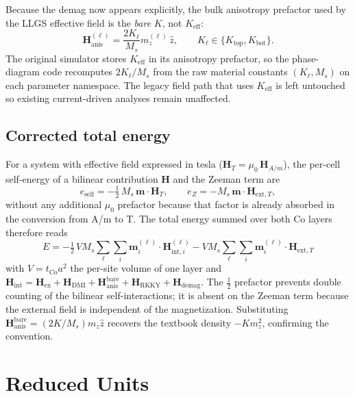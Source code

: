 \documentclass[11pt,a4paper]{article}
\newcommand{\mb}[1]{\mathbf{#1}}
\newcommand{\zhat}{\hat{z}}
\newcommand{\Hex}{\mb{H}_{\text{ex}}}
\newcommand{\Hdmi}{\mb{H}_{\text{DMI}}}
\newcommand{\Hanis}{\mb{H}_{\text{anis}}}
\newcommand{\Hdemag}{\mb{H}_{\text{demag}}}
\newcommand{\Hrkky}{\mb{H}_{\text{RKKY}}}
\newcommand{\tCo}{t_{\text{Co}}}
\newcommand{\Keff}{K_{\text{eff}}}
\newcommand{\Ms}{M_s}
\begin{document}
Because the demag now appears explicitly, the bulk
anisotropy prefactor used by the LLGS effective field is
the \emph{bare} $K$, not $\Keff$:
%
\begin{equation}
\Hanis^{(\ell)} = \frac{2 K_\ell}{\Ms} m_z^{(\ell)} \, \zhat,
\qquad K_\ell \in \{K_{\text{top}}, K_{\text{bot}}\}.
\end{equation}
%
The original simulator stores $\Keff$ in its anisotropy
prefactor, so the phase-diagram code recomputes
$2 K_\ell / \Ms$ from the raw material constants $(K_\ell,
\Ms)$ on each parameter namespace. The legacy field path
that uses $\Keff$ is left untouched so existing
current-driven analyses remain unaffected.

\subsection{Corrected total energy}

For a system with effective field expressed in tesla
($\mb{H}_T = \mu_0 \, \mb{H}_{A/m}$), the per-cell
self-energy
of a bilinear contribution $\mb{H}$ and the Zeeman term are
%
\begin{equation}\label{eq:E_density}
e_{\text{self}} = -\tfrac{1}{2}\, \Ms \,
    \mb{m} \cdot \mb{H}_T,
\qquad
e_Z = -\Ms \, \mb{m} \cdot \mb{H}_{\text{ext},T},
\end{equation}
%
without any additional $\mu_0$ prefactor because that
factor is already absorbed in the conversion from A/m to T.
The total energy summed over both Co layers therefore reads
%
\begin{equation}\label{eq:E_total}
\boxed{\;
E = -\tfrac{1}{2}\, V \Ms \!
    \sum_{\ell} \sum_{i}
    \mb{m}_i^{(\ell)} \cdot \mb{H}_{\text{int},i}^{(\ell)}
    - V \Ms \!
    \sum_{\ell} \sum_{i}
    \mb{m}_i^{(\ell)} \cdot \mb{H}_{\text{ext},T}
\;}
\end{equation}
%
with $V = \tCo a^2$ the per-site volume of one layer and
$\mb{H}_{\text{int}} =
\Hex + \Hdmi + \Hanis^{\text{bare}} + \Hrkky + \Hdemag$. The
$\tfrac{1}{2}$ prefactor prevents double counting of the
bilinear self-interactions; it is absent on the Zeeman term
because the external field is independent of the
magnetization. Substituting
$\Hanis^{\text{bare}} = (2K/\Ms) m_z \zhat$ recovers the
textbook density $-K m_z^2$, confirming the convention.

\section{Reduced Units}
\end{document}
